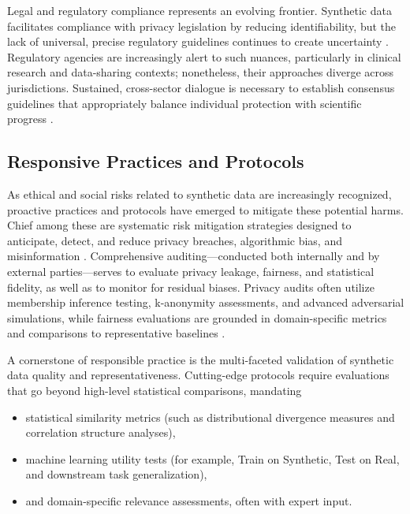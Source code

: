 Legal and regulatory compliance represents an evolving frontier. Synthetic data facilitates compliance with privacy legislation by reducing identifiability, but the lack of universal, precise regulatory guidelines continues to create uncertainty \cite{ref2}\cite{ref7}\cite{ref10}\cite{ref13}. Regulatory agencies are increasingly alert to such nuances, particularly in clinical research and data-sharing contexts; nonetheless, their approaches diverge across jurisdictions. Sustained, cross-sector dialogue is necessary to establish consensus guidelines that appropriately balance individual protection with scientific progress \cite{ref3}\cite{ref7}\cite{ref14}\cite{ref17}\cite{ref21}\cite{ref88}.

\subsection{Responsive Practices and Protocols}

As ethical and social risks related to synthetic data are increasingly recognized, proactive practices and protocols have emerged to mitigate these potential harms. Chief among these are systematic risk mitigation strategies designed to anticipate, detect, and reduce privacy breaches, algorithmic bias, and misinformation \cite{ref81}\cite{ref82}\cite{ref88}. Comprehensive auditing—conducted both internally and by external parties—serves to evaluate privacy leakage, fairness, and statistical fidelity, as well as to monitor for residual biases. Privacy audits often utilize membership inference testing, k-anonymity assessments, and advanced adversarial simulations, while fairness evaluations are grounded in domain-specific metrics and comparisons to representative baselines \cite{ref12}\cite{ref81}\cite{ref82}.

A cornerstone of responsible practice is the multi-faceted validation of synthetic data quality and representativeness. Cutting-edge protocols require evaluations that go beyond high-level statistical comparisons, mandating

\begin{itemize}
    \item statistical similarity metrics (such as distributional divergence measures and correlation structure analyses),
    \item machine learning utility tests (for example, Train on Synthetic, Test on Real, and downstream task generalization),
    \item and domain-specific relevance assessments, often with expert input.
\end{itemize}


